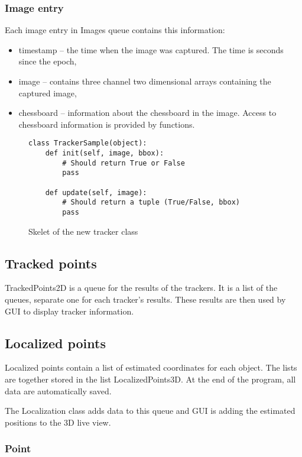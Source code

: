 \subsubsection*{Image entry}

Each image entry in Images queue contains this information: 
\begin{itemize}
\item timestamp -- the time when the image was captured. The time is seconds
since the epoch, \item image -- contains three channel two dimensional arrays
containing the captured image, \item chessboard -- information about the
chessboard in the image. Access to chessboard information is provided by
functions. 
\end{itemize}

\begin{figure}
\begin{verbatim}
class TrackerSample(object):
    def init(self, image, bbox):
        # Should return True or False
        pass
    
    def update(self, image):
        # Should return a tuple (True/False, bbox)
        pass
\end{verbatim}
\caption{Skelet of the new tracker class}
\label{fig:new-tracker}
\end{figure}

\subsection*{Tracked points}

TrackedPoints2D is a queue for the results of the trackers. It is a list of the
queues, separate one for each tracker's results. These results are then used by
GUI to display tracker information.

\subsection*{Localized points}

Localized points contain a list of estimated coordinates for each object. The
lists are together stored in the list LocalizedPoints3D. At the end of the
program, all data are automatically saved.

The Localization class adds data to this queue and GUI is adding the estimated
positions to the 3D live view.

\subsubsection*{Point}

